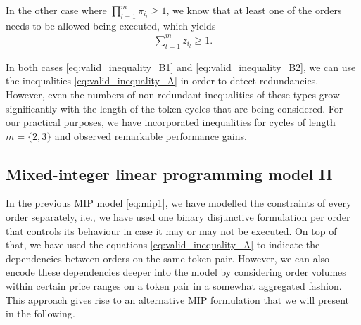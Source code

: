 \documentclass[11pt,parskip=full]{scrartcl}%
\newcommand*{\ie}{i.e., }
\begin{document}
In the other case where $\prod_{l=1}^m \pi_{i_l} \ge 1$, we know that at least one of the orders
needs to be allowed being executed, which yields
\begin{align}
  \sum\limits_{l=1}^m z_{i_l} \ge 1.
  \label{eq:valid_inequality_B2}
\end{align}

In both cases \eqref{eq:valid_inequality_B1} and \eqref{eq:valid_inequality_B2}, we can use the
inequalities \eqref{eq:valid_inequality_A} in order to detect redundancies.
However, even the numbers of non-redundant inequalities of these types grow significantly with the
length of the token cycles that are being considered.
For our practical purposes, we have incorporated inequalities for cycles of length $ m=\{2,3\} $
and observed remarkable performance gains.




\newpage
\subsection{Mixed-integer linear programming model II}
\label{subsec:MIP2}

In the previous MIP model \eqref{eq:mip1}, we have modelled the constraints of every order
separately, \ie we have used one binary disjunctive formulation per order that controls its
behaviour in case it may or may not be executed.
On top of that, we have used the equations \eqref{eq:valid_inequality_A} to indicate the
dependencies between orders on the same token pair.
However, we can also encode these dependencies deeper into the model by considering order volumes
within certain price ranges on a token pair in a somewhat aggregated fashion.
This approach gives rise to an alternative MIP formulation that we will present in the following.
\end{document}
